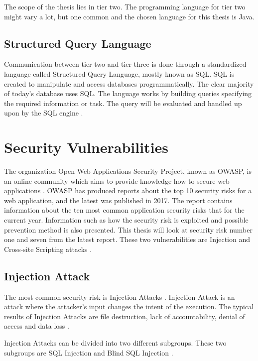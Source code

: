 The scope of the thesis lies in tier two. The programming language for tier two might vary a lot, but one common and the chosen language for this thesis is Java.



\subsection{Structured Query Language}
Communication between tier two and tier three is done through a standardized language called Structured Query Language, mostly known as SQL. SQL is created to manipulate and access databases programmatically. The clear majority of today's database uses SQL. The language works by building queries specifying the required information or task. The query will be evaluated and handled up upon by the SQL engine \parencite{DarieCristian2003TPGt}.



\section{Security Vulnerabilities}
\label{SecurityVulnerabilities}
The organization Open Web Applications Security Project, known as OWASP, is an online community which aims to provide knowledge how to secure web applications \parencite{OpenWebApplicationSecurityProject}. OWASP has produced reports about the top 10 security risks for a web application, and the latest was published in 2017. The report contains information about the ten most common application security risks that for the current year. Information such as how the security risk is exploited and possible prevention method is also presented. This thesis will look at security risk number one and seven from the latest report. These two vulnerabilities are Injection and Cross-site Scripting attacks \parencite{OWASP2017}.



\subsection{Injection Attack}
The most common security risk is Injection Attacks \parencite{OWASP2017}. Injection Attack is an attack where the attacker's input changes the intent of the execution. The typical results of Injection Attacks are file destruction, lack of accountability, denial of access and data loss \parencite{Secure_Web}.

Injection Attacks can be divided into two different subgroups. These two subgroups are SQL Injection and Blind SQL Injection \parencite{Secure_Web}.



